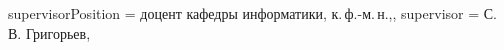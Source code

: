 {    %
    supervisorPosition = {доцент кафедры информатики, к.\,ф.-м.\,н.,},
    supervisor         = {С. В. Григорьев},
}

